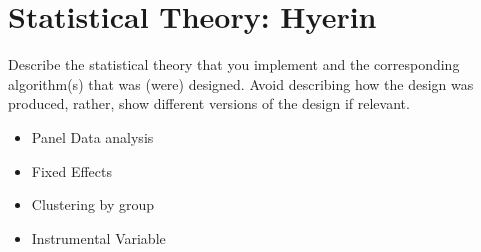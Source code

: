 \section{Statistical Theory: Hyerin}\label{Sec:Theory and Design}
Describe the statistical theory that you implement and the corresponding algorithm(s) that was (were) designed. Avoid describing how the design was produced, rather, show different versions of the design if relevant.
\begin{itemize}
\item Panel Data analysis
\item Fixed Effects
\item Clustering by group
\item Instrumental Variable
\end{itemize}
